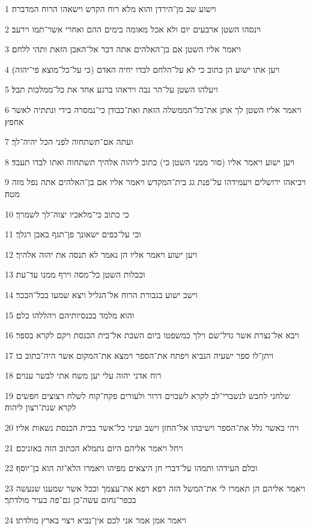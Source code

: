 \par 1 וישוע שב מן־הירדן והוא מלא רוח הקדש וישאהו הרוח המדברה׃
\par 2 וינסהו השטן ארבעים יום ולא אכל מאומה בימים ההם ואחרי אשר־תמו וירעב׃
\par 3 ויאמר אליו השטן אם בן־האלהים אתה דבר אל־האבן הזאת ותהי ללחם׃
\par 4 ויען אתו ישוע הן כתוב כי לא על־הלחם לבדו יחיה האדם (כי על־כל־מוצא פי־יהוה)׃
\par 5 ויעלהו השטן על־הר גבה ויראהו ברגע אחד את כל־ממלכות תבל׃
\par 6 ויאמר אליו השטן לך אתן את־כל־הממשלה הזאת ואת־כבודן כי־נמסרה בידי ונתתיה לאשר אחפץ׃
\par 7 ועתה אם־תשתחוה לפני הכל יהיה־לך׃
\par 8 ויען ישוע ויאמר אליו (סור ממני השטן כי) כתוב ליהוה אלהיך תשתחוה ואתו לבדו תעבד׃
\par 9 ויביאהו ירושלים ויעמידהו על־פנת גג בית־המקדש ויאמר אליו אם בן־האלהים אתה נפל מזה מטה׃
\par 10 כי כתוב כי־מלאכיו יצוה־לך לשמרך׃
\par 11 וכי על־כפים ישאונך פן־תגף באבן רגלך׃
\par 12 ויען ישוע ויאמר אליו הן נאמר לא תנסה את יהוה אלהיך׃
\par 13 וככלות השטן כל־מסה וירף ממנו עד־עת׃
\par 14 וישב ישוע בגבורת הרוח אל־הגליל ויצא שמעו בכל־הככר׃
\par 15 והוא מלמד בכנסיותיהם ויהללהו כלם׃
\par 16 ויבא אל־נצרת אשר גדל־שם וילך כמשפטו ביום השבת אל־בית הכנסת ויקם לקרא בספר׃
\par 17 ויתן־לו ספר ישעיה הנביא ויפתח את־הספר וימצא את־המקום אשר היה־כתוב בו׃
\par 18 רוח אדני יהוה עלי יען משח אתי לבשר ענוים׃
\par 19 שלחני לחבש לנשברי־לב לקרא לשבוים דרור ולעורים פקח־קוח לשלח רצוצים חפשים לקרא שנת־רצון ליהוה׃
\par 20 ויהי כאשר גלל את־הספר וישיבהו אל־החזן וישב ועיני כל־אשר בבית הכנסת נשאות אליו׃
\par 21 ויחל ויאמר אליהם היום נתמלא הכתוב הזה באזניכם׃
\par 22 וכלם העידהו ותמהו על־דברי חן היצאים מפיהו ויאמרו הלא־זה הוא בן־יוסף׃
\par 23 ויאמר אליהם הן תאמרו לי את־המשל הזה רפא רפא את־עצמך וככל אשר שמענו שנעשה בכפר־נחום עשה־כן גם־פה בעיר מולדתך׃
\par 24 ויאמר אמן אמר אני לכם אין־נביא רצוי בארץ מולדתו׃
